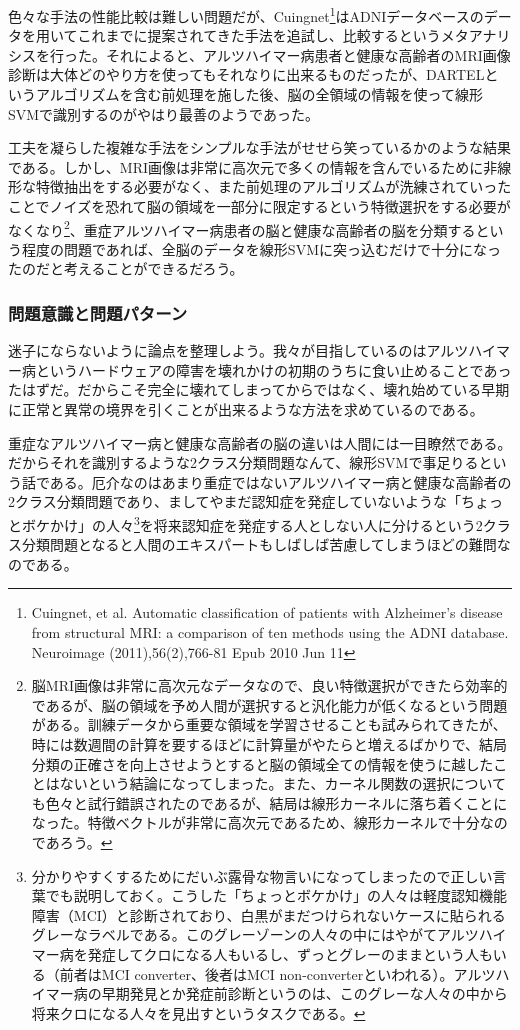 色々な手法の性能比較は難しい問題だが、Cuingnet\footnote{Cuingnet, et al. Automatic classification of patients with Alzheimer's disease from structural MRI: a comparison of ten methods using the ADNI database. Neuroimage (2011),56(2),766-81 Epub 2010 Jun 11}はADNIデータベースのデータを用いてこれまでに提案されてきた手法を追試し、比較するというメタアナリシスを行った。それによると、アルツハイマー病患者と健康な高齢者のMRI画像診断は大体どのやり方を使ってもそれなりに出来るものだったが、DARTELというアルゴリズムを含む前処理を施した後、脳の全領域の情報を使って線形SVMで識別するのがやはり最善のようであった。

工夫を凝らした複雑な手法をシンプルな手法がせせら笑っているかのような結果である。しかし、MRI画像は非常に高次元で多くの情報を含んでいるために非線形な特徴抽出をする必要がなく、また前処理のアルゴリズムが洗練されていったことでノイズを恐れて脳の領域を一部分に限定するという特徴選択をする必要がなくなり\footnote{脳MRI画像は非常に高次元なデータなので、良い特徴選択ができたら効率的であるが、脳の領域を予め人間が選択すると汎化能力が低くなるという問題がある。訓練データから重要な領域を学習させることも試みられてきたが、時には数週間の計算を要するほどに計算量がやたらと増えるばかりで、結局分類の正確さを向上させようとすると脳の領域全ての情報を使うに越したことはないという結論になってしまった。また、カーネル関数の選択についても色々と試行錯誤されたのであるが、結局は線形カーネルに落ち着くことになった。特徴ベクトルが非常に高次元であるため、線形カーネルで十分なのであろう。}、重症アルツハイマー病患者の脳と健康な高齢者の脳を分類するという程度の問題であれば、全脳のデータを線形SVMに突っ込むだけで十分になったのだと考えることができるだろう。

\subsubsection{問題意識と問題パターン}
迷子にならないように論点を整理しよう。我々が目指しているのはアルツハイマー病というハードウェアの障害を壊れかけの初期のうちに食い止めることであったはずだ。だからこそ完全に壊れてしまってからではなく、壊れ始めている早期に正常と異常の境界を引くことが出来るような方法を求めているのである。

重症なアルツハイマー病と健康な高齢者の脳の違いは人間には一目瞭然である。だからそれを識別するような2クラス分類問題なんて、線形SVMで事足りるという話である。厄介なのはあまり重症ではないアルツハイマー病と健康な高齢者の2クラス分類問題であり、ましてやまだ認知症を発症していないような「ちょっとボケかけ」の人々\footnote{分かりやすくするためにだいぶ露骨な物言いになってしまったので正しい言葉でも説明しておく。こうした「ちょっとボケかけ」の人々は軽度認知機能障害（MCI）と診断されており、白黒がまだつけられないケースに貼られるグレーなラベルである。このグレーゾーンの人々の中にはやがてアルツハイマー病を発症してクロになる人もいるし、ずっとグレーのままという人もいる（前者はMCI converter、後者はMCI non-converterといわれる）。アルツハイマー病の早期発見とか発症前診断というのは、このグレーな人々の中から将来クロになる人々を見出すというタスクである。}を将来認知症を発症する人としない人に分けるという2クラス分類問題となると人間のエキスパートもしばしば苦慮してしまうほどの難問なのである。

